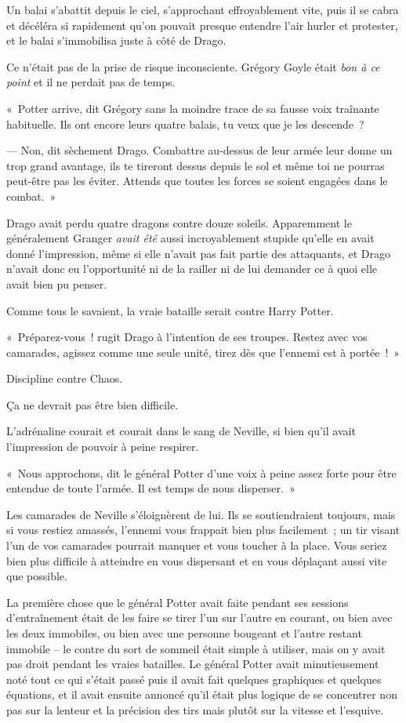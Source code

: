 \later

Un balai s'abattit depuis le ciel, s'approchant effroyablement vite, puis il se cabra et décéléra si rapidement qu'on pouvait presque entendre l'air hurler et protester, et le balai s'immobilisa juste à côté de Drago.

Ce n'était pas de la prise de risque inconsciente.
Grégory Goyle était \emph{bon à ce point} et il ne perdait pas de temps.

«~Potter arrive, dit Grégory sans la moindre trace de sa fausse voix traînante habituelle.
Ils ont encore leurs quatre balais, tu veux que je les descende~?

--- Non, dit sèchement Drago.
Combattre au-dessus de leur armée leur donne un trop grand avantage, ils te tireront dessus depuis le sol et même toi ne pourras peut-être pas les éviter.
Attends que toutes les forces se soient engagées dans le combat.~»

Drago avait perdu quatre dragons contre douze soleils.
Apparemment le généralement Granger \emph{avait été} aussi incroyablement stupide qu'elle en avait donné l'impression, même si elle n'avait pas fait partie des attaquants, et Drago n'avait donc eu l'opportunité ni de la railler ni de lui demander ce à quoi elle avait bien pu penser.

Comme tous le savaient, la vraie bataille serait contre Harry Potter.

«~Préparez-vous~! rugit Drago à l'intention de ses troupes.
Restez avec vos camarades, agissez comme une seule unité, tirez dès que l'ennemi est à portée~!~»

Discipline contre Chaos.

Ça ne devrait pas être bien difficile.

\later

L'adrénaline courait et courait dans le sang de Neville, si bien qu'il avait l'impression de pouvoir à peine respirer.

«~Nous approchons, dit le général Potter d'une voix à peine assez forte pour être entendue de toute l'armée.
Il est temps de nous disperser.~»

Les camarades de Neville s'éloignèrent de lui.
Ils se soutiendraient toujours, mais si vous restiez amassés, l'ennemi vous frappait bien plus facilement~; un tir visant l'un de vos camarades pourrait manquer et vous toucher à la place.
Vous seriez bien plus difficile à atteindre en vous dispersant et en vous déplaçant aussi vite que possible.

La première chose que le général Potter avait faite pendant ses sessions d'entraînement était de les faire se tirer l'un sur l'autre en courant, ou bien avec les deux immobiles, ou bien avec une personne bougeant et l'autre restant immobile -- le contre du sort de sommeil était simple à utiliser, mais on y avait pas droit pendant les vraies batailles.
Le général Potter avait minutieusement noté tout ce qui s'était passé puis il avait fait quelques graphiques et quelques équations, et il avait ensuite annoncé qu'il était plus logique de se concentrer non pas sur la lenteur et la précision des tirs mais plutôt sur la vitesse et l'esquive.

